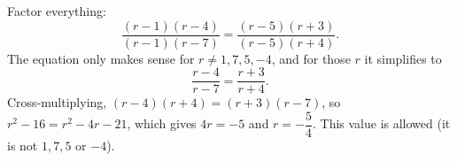 Factor everything:
\[
\dfrac{(r-1)(r-4)}{(r-1)(r-7)}=\dfrac{(r-5)(r+3)}{(r-5)(r+4)} .
\]
The equation only makes sense for $r\ne1,7,5,-4$, and for those $r$ it simplifies to
\[
\dfrac{r-4}{r-7}=\dfrac{r+3}{r+4}.
\]
Cross-multiplying, $(r-4)(r+4)=(r+3)(r-7)$, so $r^2-16=r^2-4r-21$, which gives $4r=-5$ and $r=\boxed{-\dfrac{5}{4}}$. This value is allowed (it is not $1,7,5$ or $-4$).
